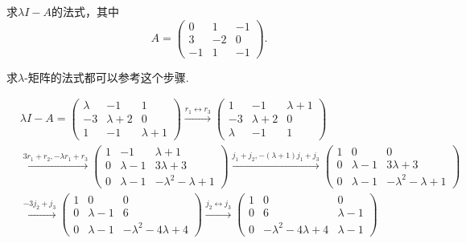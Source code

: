 \documentclass[../../main.tex]{subfiles}%
\begin{document}
\begin{example}
求$\lambda I - A$的法式，其中
\[A = \begin{pmatrix}
0 & 1 & -1 \\
3 & -2 & 0 \\
-1 & 1 & -1
\end{pmatrix}.\]
\end{example}
\begin{remark}
求$\lambda$-矩阵的法式都可以参考这个步骤.
\end{remark}
\begin{solution}

\begin{align*}
&\lambda I - A = 
\begin{pmatrix}
\lambda & -1 & 1 \\
-3 & \lambda + 2 & 0 \\
1 & -1 & \lambda + 1
\end{pmatrix}
\xrightarrow{r_1\leftrightarrow r_3}
\begin{pmatrix}
1 & -1 & \lambda + 1 \\
-3 & \lambda + 2 & 0 \\
\lambda & -1 & 1
\end{pmatrix}\\
&\xrightarrow{3r_1+r_2,-\lambda r_1+r_3}
\begin{pmatrix}
1 & -1 & \lambda + 1 \\
0 & \lambda - 1 & 3\lambda + 3 \\
0 & \lambda - 1 & -\lambda^2 - \lambda + 1
\end{pmatrix}
\xrightarrow{j_1+j_2,-(\lambda +1)j_1+j_3}
\begin{pmatrix}
1 & 0 & 0 \\
0 & \lambda - 1 & 3\lambda + 3 \\
0 & \lambda - 1 & -\lambda^2 - \lambda + 1
\end{pmatrix}\\
&\xrightarrow{-3j_2+j_3}
\begin{pmatrix}
1 & 0 & 0 \\
0 & \lambda - 1 & 6 \\
0 & \lambda - 1 & -\lambda^2 - 4\lambda + 4
\end{pmatrix}
\xrightarrow{j_2\leftrightarrow j_3}
\begin{pmatrix}
1 & 0 & 0 \\
0 & 6 & \lambda - 1 \\
0 & -\lambda^2 - 4\lambda + 4 & \lambda - 1
\end{pmatrix}\\

\end{align*}
\end{solution}
\end{document}
